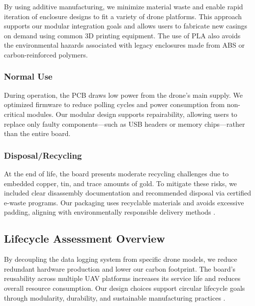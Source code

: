 \documentclass[12pt]{article}
\begin{document}
\par By using additive manufacturing, we minimize material waste and enable rapid iteration of enclosure designs to fit a variety of drone platforms. This approach supports our modular integration goals and allows users to fabricate new casings on demand using common 3D printing equipment. The use of PLA also avoids the environmental hazards associated with legacy enclosures made from ABS or carbon-reinforced polymers.

\subsubsection{Normal Use}

\par During operation, the PCB draws low power from the drone’s main supply. We optimized firmware to reduce polling cycles and power consumption from non-critical modules. Our modular design supports repairability, allowing users to replace only faulty components—such as USB headers or memory chips—rather than the entire board.

\subsubsection{Disposal/Recycling}

\par At the end of life, the board presents moderate recycling challenges due to embedded copper, tin, and trace amounts of gold. To mitigate these risks, we included clear disassembly documentation and recommended disposal via certified e-waste programs. Our packaging uses recyclable materials and avoids excessive padding, aligning with environmentally responsible delivery methods \cite{goncalves_uav}.

\subsection{Lifecycle Assessment Overview}

\par By decoupling the data logging system from specific drone models, we reduce redundant hardware production and lower our carbon footprint. The board’s reusability across multiple UAV platforms increases its service life and reduces overall resource consumption. Our design choices support circular lifecycle goals through modularity, durability, and sustainable manufacturing practices \cite{goncalves_uav}.
\end{document}
